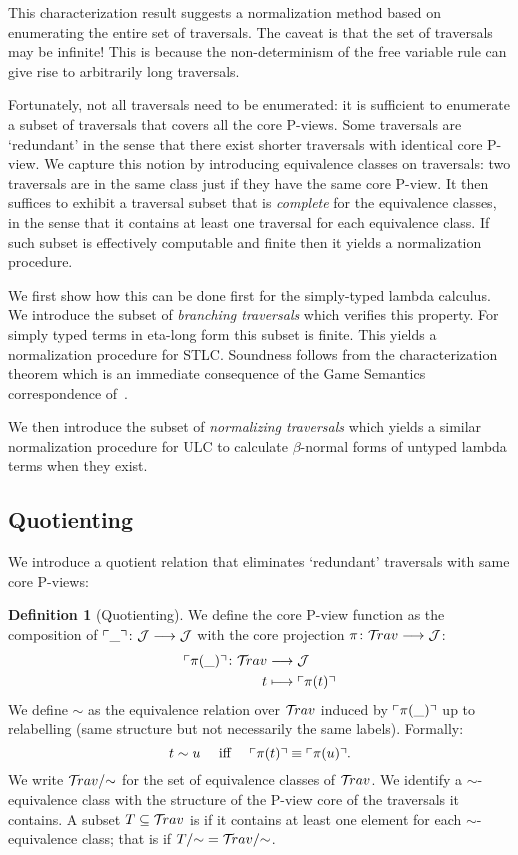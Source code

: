 \documentclass{article}
\theoremstyle{plain}
\theoremstyle{definition}
\newtheorem{definition}{Definition}[section]
\theoremstyle{remark}
\newcommand{\travulc}{\travset}
\def\coresymbol{\pi} %
\newcommand{\core}[1]{\coresymbol(#1)} %
\def\justseqset{\mathcal{J}}
\begin{document}
This characterization result suggests a normalization method based on enumerating the entire set of traversals. The caveat is that the set of traversals may be infinite! This is because the non-determinism of the free variable rule can give rise to arbitrarily long traversals.

Fortunately, not all traversals need to be enumerated: it is sufficient to enumerate a subset of traversals that covers all the core P-views. Some traversals are `redundant' in the sense that there exist shorter traversals with identical core P-view. We capture this notion by introducing equivalence classes on traversals: two traversals are in the same class just if they have the same core P-view. It then suffices to exhibit a traversal subset that is \emph{complete} for the equivalence classes, in the sense that it contains at least one traversal for each equivalence class. If such subset is effectively computable and finite then it yields a normalization procedure.

We first show how this can be done first for the simply-typed lambda calculus. We introduce the subset of \emph{branching traversals} which verifies this property. For simply typed terms in eta-long form this subset is finite. This yields a normalization procedure for STLC.
Soundness follows from the characterization theorem which is an immediate consequence of the Game Semantics correspondence of~\cite{BlumPhd}.

We then introduce the subset of \emph{normalizing traversals} which yields a similar normalization procedure for ULC to calculate $\beta$-normal forms of untyped lambda terms when they exist.

\subsection{Quotienting}

We introduce a quotient relation that eliminates `redundant' traversals with same core P-views:
\begin{definition}[Quotienting]
We define the core P-view function as the composition of $\pview{\_}\colon \justseqset \longrightarrow \justseqset$ with the core projection $\coresymbol\colon\travulc  \longrightarrow \justseqset$:
\begin{align*}
\pview{\core{\_}} \colon \travulc & \longrightarrow \justseqset \\
t & \longmapsto \pview{\core{t}}
\end{align*}
We define $\sim$ as the equivalence relation over $\travulc$ induced by $\pview{\core{\_}}$ up to relabelling (same structure but not necessarily the same labels). Formally:
$$t \sim u \quad \mbox{ iff } \quad  \pview{\core{t}} \equiv \pview{\core{u}} .$$
We write $\travulc/{\sim}$ for the set of equivalence classes of $\travulc$. We identify a $\sim$-equivalence class with the structure of the P-view core of the traversals it contains. A subset $T\subseteq \travulc$ is  if it contains at least one element for each $\sim$-equivalence class; that is if $T/{\sim} = \travulc/{\sim}$.
\end{definition}
\end{document}
